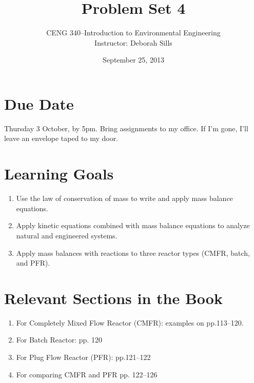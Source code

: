 \documentclass[12pt,letterpaper]{article}
\begin{document}
\setlength{\parindent}{0cm} 


\frenchspacing

\title {Problem Set 4} 
\author {CENG 340--Introduction to Environmental Engineering\\
Instructor: Deborah Sills}
\date {September 25, 2013}
\maketitle

\section *{Due Date}
Thursday 3 October, by 5pm.  Bring assignments to my office.  If I'm gone, I'll leave an envelope taped to my door.\\

\section *{Learning Goals}
\begin{enumerate}
\item Use the law of conservation of mass to write and apply mass balance equations.
\item Apply kinetic equations combined with mass balance equations to analyze natural and engineered systems.
\item Apply mass balances with reactions to three reactor types (CMFR, batch, and PFR).

\end{enumerate}

\section *{Relevant Sections in the Book}
\begin{enumerate}
\item For Completely Mixed Flow Reactor (CMFR): examples on pp.113--120.
\item For Batch Reactor: pp. 120
\item For Plug Flow Reactor (PFR): pp.121--122
\item For comparing CMFR and PFR pp. 122--126
\end{enumerate}
\end{document}
